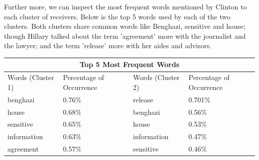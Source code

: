 Further more, we can inspect the most frequent words mentioned by Clinton to each cluster of receivers. Below is the top 5 words used by each of the two clusters. Both clusters share common words like Benghazi, sensitive and house; though Hillary talked about the term 'agreement' more with the journalist and the lawyer; and the term 'release' more with her aides and advisors. 

\begin{center}
\begin{tabular}{ |p{3cm}|p{3cm}|| p{3cm}|p{3cm}|  }
 \hline
 \multicolumn{4}{|c|}{Top 5 Most Frequent Words} \\
 \hline
 Words (Cluster 1)  & Percentage of Occurrence & Words (Cluster 2) & Percentage of Occurrence\\
 \hline
 benghazi & 0.76\% & release  & 0.701\% \\
 house &  0.68\% & benghazi & 0.56\% \\
 sensitive & 0.65\% & house & 0.53\%\\
 information & 0.63\% & information & 0.47\%\\
 agreement & 0.57\% &  sensitive  & 0.46\% \\
 \hline
\end{tabular}
\end{center}
